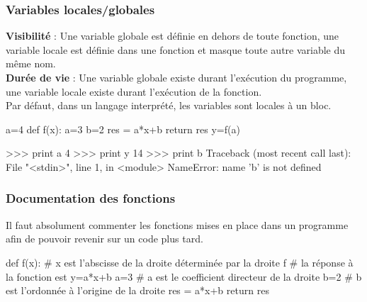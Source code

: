 \begin{frame}[fragile]
\frametitle{Variables locales/globales}

\begin{defi}
\textbf{Visibilité} : Une variable globale est définie en dehors de toute fonction, une variable locale est définie dans une
fonction et masque toute autre variable du même nom. \\
\textbf{Durée de vie} : Une variable globale existe durant l'exécution du programme, une variable locale existe durant
l'exécution de la fonction. \\
Par défaut, dans un langage interprété, les variables sont locales à un bloc.
\end{defi}

\begin{minipage}{0.3\linewidth}
\begin{GrayBox}[0.75\textwidth]
\begin{verbatimtab}[3]
a=4
def f(x):
	a=3
	b=2
	res = a*x+b
	return res
y=f(a)
\end{verbatimtab}
\end{GrayBox}
\end{minipage}\hfill
\begin{minipage}{0.65\linewidth}
\begin{GrayBox}[0.75\textwidth]
\begin{verbatimtab}[3]
>>> print a
4
>>> print y
14
>>> print b
Traceback (most recent call last):
  File "<stdin>", line 1, in <module>
NameError: name 'b' is not defined
\end{verbatimtab}
\end{GrayBox}
\end{minipage}
\end{frame}

\begin{frame}[fragile]
\frametitle{Documentation des fonctions}

Il faut absolument commenter les fonctions mises en place dans un programme afin de pouvoir revenir sur un code plus tard.

\begin{GrayBox}[0.8\textwidth]
\begin{verbatimtab}[3]
def f(x):
	# x est l'abscisse de la droite déterminée par la droite f
	# la réponse à la fonction est y=a*x+b
	a=3
	# a est le coefficient directeur de la droite
	b=2
	# b est l'ordonnée à l'origine de la droite
	res = a*x+b
	return res
\end{verbatimtab}
\end{GrayBox}
\end{frame}

